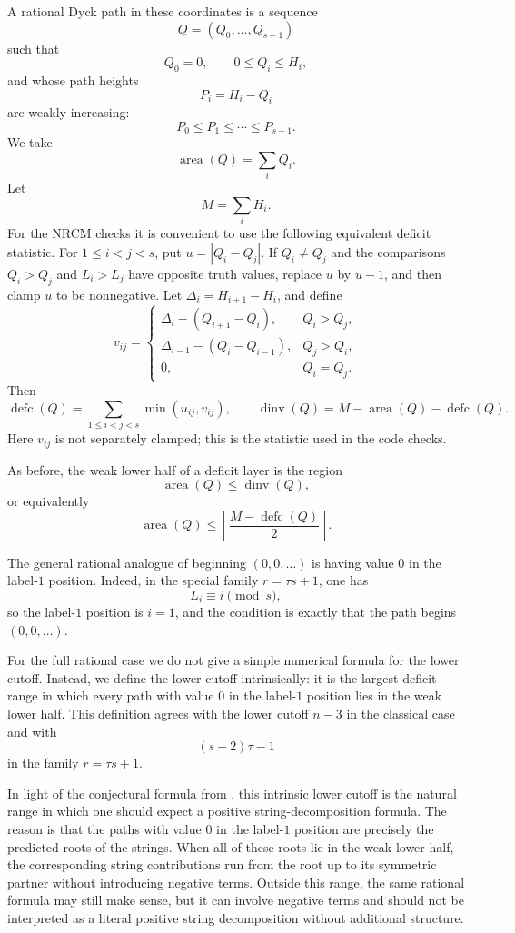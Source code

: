 \documentclass[11pt]{article}
\newcommand{\area}{\operatorname{area}}
\newcommand{\dinv}{\operatorname{dinv}}
\newcommand{\defc}{\operatorname{defc}}
\begin{document}
A rational Dyck path in these coordinates is a sequence
\[
  Q=(Q_0,\ldots,Q_{s-1})
\]
such that
\[
  Q_0=0,\qquad 0\le Q_i\le H_i,
\]
and whose path heights
\[
  P_i=H_i-Q_i
\]
are weakly increasing:
\[
  P_0\le P_1\le\cdots\le P_{s-1}.
\]
We take
\[
  \area(Q)=\sum_i Q_i.
\]
Let
\[
  M=\sum_i H_i.
\]
For the NRCM checks it is convenient to use the following equivalent deficit
statistic.  For \(1\le i<j<s\), put \(u=|Q_i-Q_j|\).  If \(Q_i\ne Q_j\) and
the comparisons \(Q_i>Q_j\) and \(L_i>L_j\) have opposite truth values, replace
\(u\) by \(u-1\), and then clamp \(u\) to be nonnegative.  Let
\(\Delta_i=H_{i+1}-H_i\), and define
\[
  v_{ij}=\begin{cases}
  \Delta_i-(Q_{i+1}-Q_i), & Q_i>Q_j,\\
  \Delta_{i-1}-(Q_i-Q_{i-1}), & Q_j>Q_i,\\
  0, & Q_i=Q_j.
  \end{cases}
\]
Then
\[
  \defc(Q)=\sum_{1\le i<j<s}\min(u_{ij},v_{ij}),
  \qquad
  \dinv(Q)=M-\area(Q)-\defc(Q).
\]
Here \(v_{ij}\) is not separately clamped; this is the statistic used in the
code checks.

As before, the weak lower half of a deficit layer is the region
\[
  \area(Q)\le \dinv(Q),
\]
or equivalently
\[
  \area(Q)\le \left\lfloor\frac{M-\defc(Q)}2\right\rfloor.
\]

The general rational analogue of beginning \((0,0,\ldots)\) is having value
\(0\) in the label-\(1\) position.  Indeed, in the special family
\(r=\tau s+1\), one has
\[
  L_i\equiv i\pmod s,
\]
so the label-\(1\) position is \(i=1\), and the condition is exactly that the
path begins \((0,0,\ldots)\).

For the full rational case we do not give a simple numerical formula for the
lower cutoff.  Instead, we define the lower cutoff intrinsically: it is the
largest deficit range in which every path with value \(0\) in the label-\(1\)
position lies in the weak lower half.  This definition agrees with the lower
cutoff \(n-3\) in the classical case and with
\[
  (s-2)\tau-1
\]
in the family \(r=\tau s+1\).

In light of the conjectural formula from \cite{Hawkes2022}, this intrinsic
lower cutoff is the natural range in which one should expect a positive
string-decomposition formula.  The reason is that the paths with value \(0\)
in the label-\(1\) position are precisely the predicted roots of the strings.
When all of these roots lie in the weak lower half, the corresponding string
contributions run from the root up to its symmetric partner without introducing
negative terms.  Outside this range, the same rational formula may still make
sense, but it can involve negative terms and should not be interpreted as a
literal positive string decomposition without additional structure.
\end{document}
